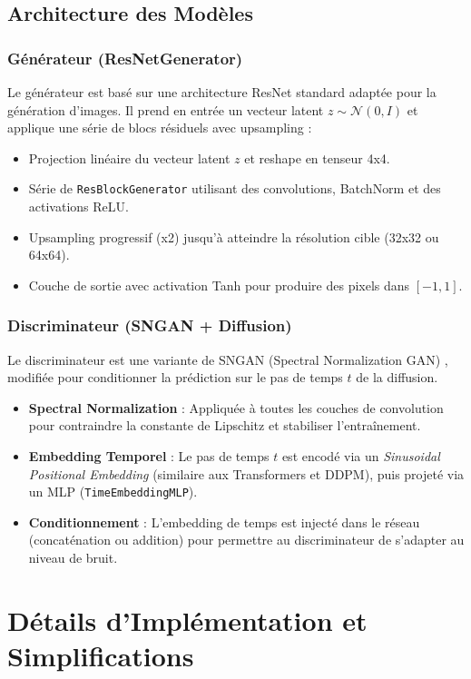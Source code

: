 \documentclass[a4paper,11pt]{article}
\begin{document}
\subsection{Architecture des Modèles}

\subsubsection{Générateur (ResNetGenerator)}
Le générateur est basé sur une architecture ResNet standard adaptée pour la génération d'images. Il prend en entrée un vecteur latent $z \sim \mathcal{N}(0, I)$ et applique une série de blocs résiduels avec upsampling :
\begin{itemize}
    \item Projection linéaire du vecteur latent $z$ et reshape en tenseur 4x4.
    \item Série de \texttt{ResBlockGenerator} utilisant des convolutions, BatchNorm et des activations ReLU.
    \item Upsampling progressif (x2) jusqu'à atteindre la résolution cible (32x32 ou 64x64).
    \item Couche de sortie avec activation Tanh pour produire des pixels dans $[-1, 1]$.
\end{itemize}

\subsubsection{Discriminateur (SNGAN + Diffusion)}
Le discriminateur est une variante de SNGAN (Spectral Normalization GAN) \cite{miyato2018spectral}, modifiée pour conditionner la prédiction sur le pas de temps $t$ de la diffusion.
\begin{itemize}
    \item \textbf{Spectral Normalization} : Appliquée à toutes les couches de convolution pour contraindre la constante de Lipschitz et stabiliser l'entraînement.
    \item \textbf{Embedding Temporel} : Le pas de temps $t$ est encodé via un \textit{Sinusoidal Positional Embedding} (similaire aux Transformers et DDPM), puis projeté via un MLP (\texttt{TimeEmbeddingMLP}).
    \item \textbf{Conditionnement} : L'embedding de temps est injecté dans le réseau (concaténation ou addition) pour permettre au discriminateur de s'adapter au niveau de bruit.
\end{itemize}

\section{Détails d'Implémentation et Simplifications}
\end{document}
